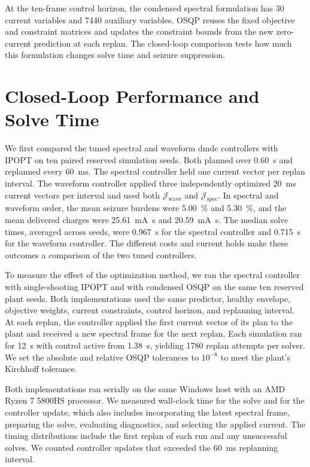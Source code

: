 At the ten-frame control horizon, the condensed spectral formulation has 30 current variables and \num{7440} auxiliary variables.
OSQP reuses the fixed objective and constraint matrices and updates the constraint bounds from the new zero-current prediction at each replan.
The closed-loop comparison tests how much this formulation changes solve time and seizure suppression.

\section{Closed-Loop Performance and Solve Time}

We first compared the tuned spectral and waveform \ac{dmdc} controllers with IPOPT on ten paired reserved simulation seeds.
Both planned over \SI{0.60}{\second} and replanned every \SI{60}{\milli\second}.
The spectral controller held one current vector per replan interval.
The waveform controller applied three independently optimized \SI{20}{\milli\second} current vectors per interval and used both $\mathcal J_{\mathrm{wave}}$ and $\mathcal J_{\mathrm{spec}}$.
In spectral and waveform order, the mean seizure burdens were \SI{5.00}{\percent} and \SI{5.30}{\percent}, and the mean delivered charges were \SI{25.61}{\milli\ampere\second} and \SI{20.59}{\milli\ampere\second}.
The median solve times, averaged across seeds, were \SI{0.967}{\second} for the spectral controller and \SI{0.715}{\second} for the waveform controller.
The different costs and current holds make these outcomes a comparison of the two tuned controllers.

To measure the effect of the optimization method, we ran the spectral controller with single-shooting IPOPT and with condensed OSQP on the same ten reserved plant seeds.
Both implementations used the same predictor, healthy envelope, objective weights, current constraints, control horizon, and replanning interval.
At each replan, the controller applied the first current vector of its plan to the plant and received a new spectral frame for the next replan.
Each simulation ran for \SI{12}{\second} with control active from \SI{1.38}{\second}, yielding \num{1780} replan attempts per solver.
We set the absolute and relative OSQP tolerances to $10^{-8}$ to meet the plant's Kirchhoff tolerance.

Both implementations ran serially on the same Windows host with an AMD Ryzen 7 5800HS processor.
We measured wall-clock time for the solve and for the controller update, which also includes incorporating the latest spectral frame, preparing the solve, evaluating diagnostics, and selecting the applied current.
The timing distributions include the first replan of each run and any unsuccessful solves.
We counted controller updates that exceeded the \SI{60}{\milli\second} replanning interval.

